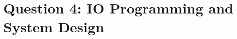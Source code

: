 \section*{Question 4: \small{IO Programming and System Design}}



\clearpage


\clearpage


\clearpage

